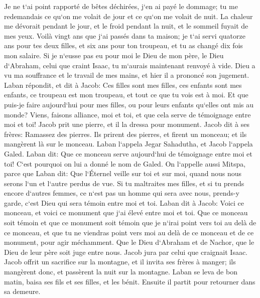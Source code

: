 \verse Je ne t`ai point rapporté de bêtes déchirées, j`en ai payé le dommage; tu me redemandais ce qu`on me volait de jour et ce qu`on me volait de nuit. 
\verse La chaleur me dévorait pendant le jour, et le froid pendant la nuit, et le sommeil fuyait de mes yeux. 
\verse Voilà vingt ans que j`ai passés dans ta maison; je t`ai servi quatorze ans pour tes deux filles, et six ans pour ton troupeau, et tu as changé dix fois mon salaire. 
\verse Si je n`eusse pas eu pour moi le Dieu de mon père, le Dieu d`Abraham, celui que craint Isaac, tu m`aurais maintenant renvoyé à vide. Dieu a vu ma souffrance et le travail de mes mains, et hier il a prononcé son jugement. 
\verse Laban répondit, et dit à Jacob: Ces filles sont mes filles, ces enfants sont mes enfants, ce troupeau est mon troupeau, et tout ce que tu vois est à moi. Et que puis-je faire aujourd`hui pour mes filles, ou pour leurs enfants qu`elles ont mis au monde? 
\verse Viens, faisons alliance, moi et toi, et que cela serve de témoignage entre moi et toi! 
\verse Jacob prit une pierre, et il la dressa pour monument. 
\verse Jacob dit à ses frères: Ramassez des pierres. Ils prirent des pierres, et firent un monceau; et ils mangèrent là sur le monceau. 
\verse Laban l`appela Jegar Sahadutha, et Jacob l`appela Galed. 
\verse Laban dit: Que ce monceau serve aujourd`hui de témoignage entre moi et toi! C`est pourquoi on lui a donné le nom de Galed. 
\verse On l`appelle aussi Mitspa, parce que Laban dit: Que l`Éternel veille sur toi et sur moi, quand nous nous serons l`un et l`autre perdus de vue. 
\verse Si tu maltraites mes filles, et si tu prends encore d`autres femmes, ce n`est pas un homme qui sera avec nous, prends-y garde, c`est Dieu qui sera témoin entre moi et toi. 
\verse Laban dit à Jacob: Voici ce monceau, et voici ce monument que j`ai élevé entre moi et toi. 
\verse Que ce monceau soit témoin et que ce monument soit témoin que je n`irai point vers toi au delà de ce monceau, et que tu ne viendras point vers moi au delà de ce monceau et de ce monument, pour agir méchamment. 
\verse Que le Dieu d`Abraham et de Nachor, que le Dieu de leur père soit juge entre nous. Jacob jura par celui que craignait Isaac. 
\verse Jacob offrit un sacrifice sur la montagne, et il invita ses frères à manger; ils mangèrent donc, et passèrent la nuit sur la montagne. 
\verse Laban se leva de bon matin, baisa ses fils et ses filles, et les bénit. Ensuite il partit pour retourner dans sa demeure. 

